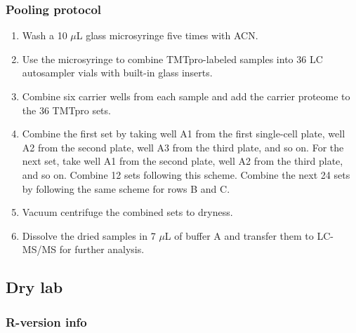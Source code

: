 \documentclass[
  11pt,
]{article}
\begin{document}
\hypertarget{pooling-protocol}{%
\subsubsection{Pooling protocol}\label{pooling-protocol}}

\begin{enumerate}
\item Wash a 10 $\mu$L glass microsyringe five times with ACN.
\item Use the microsyringe to combine TMTpro-labeled samples into 36 LC autosampler vials with built-in glass inserts.
\item Combine six carrier wells from each sample and add the carrier proteome to the 36 TMTpro sets.
\item Combine the first set by taking well A1 from the first single-cell plate, well A2 from the second plate, well A3 from the third plate, and so on. For the next set, take well A1 from the second plate, well A2 from the third plate, and so on. Combine 12 sets following this scheme. Combine the next 24 sets by following the same scheme for rows B and C.
\item Vacuum centrifuge the combined sets to dryness.
\item Dissolve the dried samples in 7 $\mu$L of buffer A and transfer them to LC-MS/MS for further analysis.
\end{enumerate}

\hypertarget{dry-lab}{%
\subsection{Dry lab}\label{dry-lab}}

\hypertarget{r-version-info}{%
\subsubsection{R-version info}\label{r-version-info}}
\end{document}

